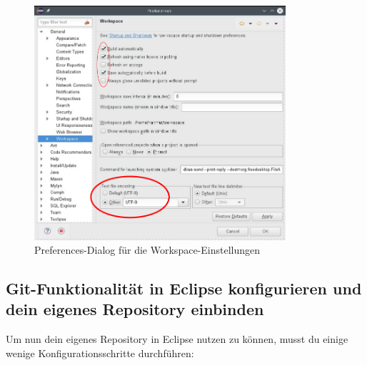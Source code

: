 \begin{figure}[h]
  \centering
  \includegraphics[width=0.83\textwidth]{./inf/SEKII/01_Vorbereitung/Eclipse-Workspace-Preferences.png}
  \caption{Preferences-Dialog für die Workspace-Einstellungen}
  \label{fig:eclipse-workspace-preferences}
\end{figure}

\afterpage{\clearpage}

\subsection{Git-Funktionalität in Eclipse konfigurieren und dein eigenes
Repository einbinden}

%
% 
%
%
%
%
Um nun dein eigenes Repository in Eclipse nutzen zu können, musst du einige
wenige Konfigurationsschritte durchführen:

